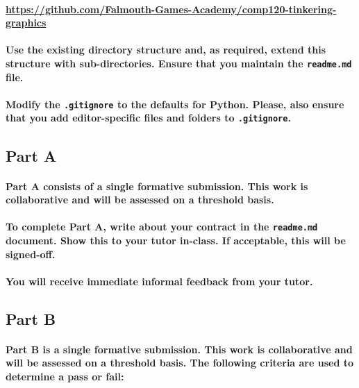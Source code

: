 \documentclass{../../fal_assignment}
\begin{document}
\paragraph{\url{https://github.com/Falmouth-Games-Academy/comp120-tinkering-graphics}}

\paragraph{Use the existing directory structure and, as required, extend this structure with sub-directories. Ensure that you maintain the \texttt{readme.md} file.}

\paragraph{Modify the \texttt{.gitignore} to the defaults for \textbf{Python}. Please, also ensure that you add editor-specific files and folders to \texttt{.gitignore}.}

\subsection*{Part A}

\paragraph{Part A consists of a \textbf{single formative submission}. This work is \textbf{collaborative} and will be assessed on a \textbf{threshold} basis.}

\paragraph{To complete Part A, write about your contract in the \texttt{readme.md} document.  Show this to your tutor in-class.  If acceptable, this will be signed-off.} 

\paragraph{You will receive immediate \textbf{informal feedback} from your \textbf{tutor}.}

\subsection*{Part B}

\paragraph{Part B is a \textbf{single formative submission}. This work is \textbf{collaborative} and will be assessed on a \textbf{threshold} basis. The following criteria are used to determine a pass or fail:}
\end{document}
